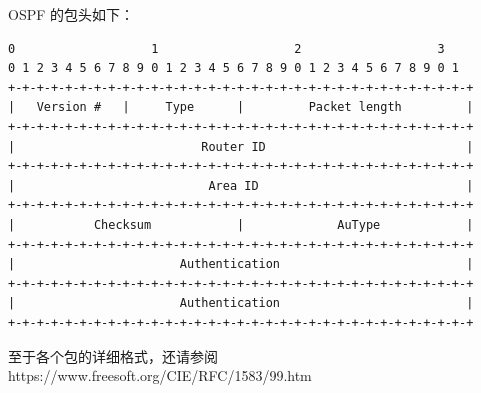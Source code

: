 \documentclass[black,normal,cn]{elegantnote}
\begin{document}
OSPF 的包头如下：

\begin{lstlisting}
0                   1                   2                   3
0 1 2 3 4 5 6 7 8 9 0 1 2 3 4 5 6 7 8 9 0 1 2 3 4 5 6 7 8 9 0 1
+-+-+-+-+-+-+-+-+-+-+-+-+-+-+-+-+-+-+-+-+-+-+-+-+-+-+-+-+-+-+-+-+
|   Version #   |     Type      |         Packet length         |
+-+-+-+-+-+-+-+-+-+-+-+-+-+-+-+-+-+-+-+-+-+-+-+-+-+-+-+-+-+-+-+-+
|                          Router ID                            |
+-+-+-+-+-+-+-+-+-+-+-+-+-+-+-+-+-+-+-+-+-+-+-+-+-+-+-+-+-+-+-+-+
|                           Area ID                             |
+-+-+-+-+-+-+-+-+-+-+-+-+-+-+-+-+-+-+-+-+-+-+-+-+-+-+-+-+-+-+-+-+
|           Checksum            |             AuType            |
+-+-+-+-+-+-+-+-+-+-+-+-+-+-+-+-+-+-+-+-+-+-+-+-+-+-+-+-+-+-+-+-+
|                       Authentication                          |
+-+-+-+-+-+-+-+-+-+-+-+-+-+-+-+-+-+-+-+-+-+-+-+-+-+-+-+-+-+-+-+-+
|                       Authentication                          |
+-+-+-+-+-+-+-+-+-+-+-+-+-+-+-+-+-+-+-+-+-+-+-+-+-+-+-+-+-+-+-+-+
\end{lstlisting}

至于各个包的详细格式，还请参阅 https://www.freesoft.org/CIE/RFC/1583/99.htm
\end{document}
